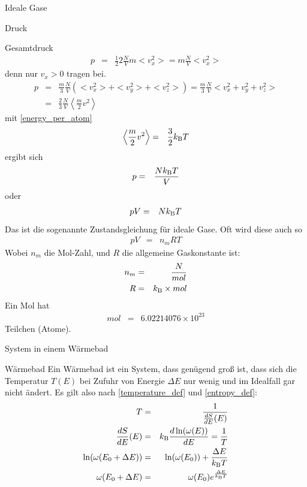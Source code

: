 \begin{chapter}{\titlestr}
\begin{section}{Ideale Gase}
\begin{subsection}{Druck}
\begin{subsubsection}{Gesamtdruck}
\begin{eqnarray*}
p &=&\frac{1}{2}2\frac{N}{V}m<v_x^2>=m\frac{N}{V}<v_x^2>
\end{eqnarray*}
denn nur $v_x>0$ tragen bei.
\begin{eqnarray*}
p &=& \frac{m}{3}\frac{N}{V}(<v_x^2>+<v_y^2>+<v_z^2>)=\frac{m}{3}\frac{N}{V}<v_x^2+v_y^2+v_z^2>\\
&=&\frac{2}{3}\frac{N}{V}\left<\frac{m}{2}v^2\right>
\end{eqnarray*}
mit \ref{energy_per_atom}
\begin{eqnarray*}
\left<\frac{m}{2}v^2\right> &=&\frac{3}{2}k_{\mathrm{B}} T
\end{eqnarray*}
ergibt sich
\begin{eqnarray*}
p &=& \frac{Nk_{\mathrm{B}} T}{V}
\end{eqnarray*}
oder
\begin{eqnarray}
\label{ideal_gas_state_eqn}
pV &=& Nk_{\mathrm{B}} T
\end{eqnarray}
Das ist die sogenannte Zustandsgleichung für ideale Gase. Oft wird diese auch so
\begin{eqnarray*}
pV &=& n_mRT
\end{eqnarray*}
Wobei $n_m$ die Mol-Zahl, und $R$ die allgemeine Gaskonstante ist:
\begin{eqnarray*}
n_m &=& \frac{N}{mol}\\
R &=& k_{\mathrm{B}} \times mol
\end{eqnarray*}
Ein Mol hat
\begin{eqnarray*}
mol &=&6.02214076\times 10^{23}
\end{eqnarray*}
Teilchen (Atome).
\end{subsubsection}
\end{subsection}
\end{section}

\begin{section}{System in einem Wärmebad}
\begin{subsection}{Wärmebad}
Ein Wärmebad ist ein System, dass genügend groß ist, dass sich die Temperatur $T(E)$ bei Zufuhr von Energie $\Delta E$ nur wenig 
und im Idealfall gar nicht ändert. Es gilt also nach \ref{temperature_def} und \ref{entropy_def}:
\begin{eqnarray*}
T &=& \frac{1}{\frac{dS}{dE}(E)}\\
\frac{dS}{dE}(E) &=& k_{\mathrm{B}} \frac{d\ln(\omega(E))}{dE} = \frac{1}{T}\\
\ln(\omega(E_0+\Delta E)) &=& \ln(\omega(E_0))+\frac{\Delta E}{k_{\mathrm{B}} T}\\
\omega(E_0+\Delta E) &=& \omega(E_0)e^\frac{\Delta E}{k_{\mathrm{B}} T}
\end{eqnarray*}
\end{subsection}


\end{section}
\end{chapter}
